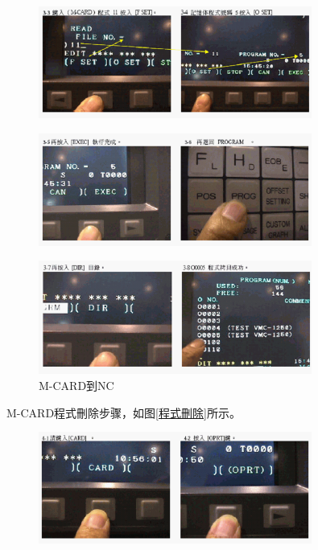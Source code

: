 \begin{figure}[!hbtp]
	\centering	\includegraphics[width=0.8\textwidth]{images/14-19}
\end{figure}

\begin{figure}[!hbtp]
	\centering	\includegraphics[width=0.8\textwidth]{images/14-20}
\end{figure}

\begin{figure}[!hbtp]
	\centering	\includegraphics[width=0.8\textwidth]{images/14-21}
	\caption{M-CARD到NC} \label{M-CARD到NC}
\end{figure}

M-CARD程式刪除步骤，如图\ref{程式刪除}所示。

\begin{figure}[!hbtp]
	\centering	\includegraphics[width=0.8\textwidth]{images/14-22}
\end{figure}

